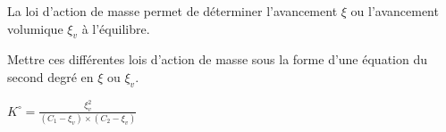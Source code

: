 



\finEntrainement






\hauteurLargeurCadreReponse		{12mm}{8cm} %
\initialisationEntrainement

La loi d'action de masse permet de déterminer l'avancement $\xi$ ou l'avancement volumique $\xi_v$ à l'équilibre. 

Mettre ces différentes lois d'action de masse sous la forme d'une équation du second degré en $\xi$ ou $\xi_v$.

\bigskip


\debutEntrainement



\begin{enonce}
$K^\circ=\frac{\xi^2_v}{(C_1-\xi_v)\times(C_2-\xi_v)}$
\end{enonce}



